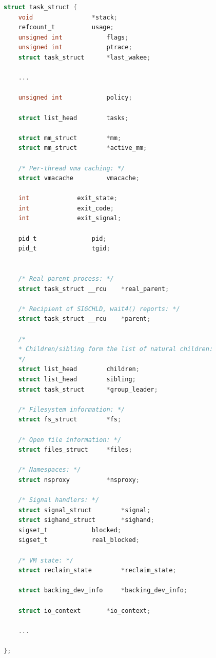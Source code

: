 \begin{figure}[ht!]
\end{figure}

\newpage

\begin{lstlisting}[language=c, label=some-code, caption=Структура task\_struct]
struct task_struct {	
	void				*stack;
	refcount_t			usage;
	unsigned int			flags;
	unsigned int			ptrace;
	struct task_struct		*last_wakee;

	...

	unsigned int			policy;

	struct list_head		tasks;

	struct mm_struct		*mm;
	struct mm_struct		*active_mm;

	/* Per-thread vma caching: */
	struct vmacache			vmacache;

	int				exit_state;
	int				exit_code;
	int				exit_signal;

	pid_t				pid;
	pid_t				tgid;


	/* Real parent process: */
	struct task_struct __rcu	*real_parent;

	/* Recipient of SIGCHLD, wait4() reports: */
	struct task_struct __rcu	*parent;

	/*
	* Children/sibling form the list of natural children:
	*/
	struct list_head		children;
	struct list_head		sibling;
	struct task_struct		*group_leader;

	/* Filesystem information: */
	struct fs_struct		*fs;

	/* Open file information: */
	struct files_struct		*files;

	/* Namespaces: */
	struct nsproxy			*nsproxy;

	/* Signal handlers: */
	struct signal_struct		*signal;
	struct sighand_struct		*sighand;
	sigset_t			blocked;
	sigset_t			real_blocked;

	/* VM state: */
	struct reclaim_state		*reclaim_state;

	struct backing_dev_info		*backing_dev_info;

	struct io_context		*io_context;
	
	...	

};
\end{lstlisting}

